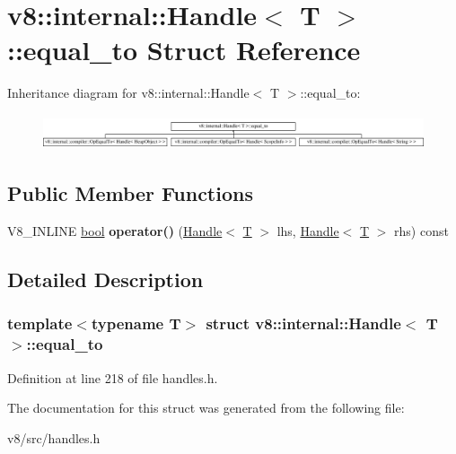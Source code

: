\hypertarget{structv8_1_1internal_1_1Handle_1_1equal__to}{}\section{v8\+:\+:internal\+:\+:Handle$<$ T $>$\+:\+:equal\+\_\+to Struct Reference}
\label{structv8_1_1internal_1_1Handle_1_1equal__to}
Inheritance diagram for v8\+:\+:internal\+:\+:Handle$<$ T $>$\+:\+:equal\+\_\+to\+:\begin{figure}[H]
\begin{center}
\leavevmode
\includegraphics[height=1.039926cm]{structv8_1_1internal_1_1Handle_1_1equal__to}
\end{center}
\end{figure}
\subsection*{Public Member Functions}
\begin{DoxyCompactItemize}
\item 
\mbox{\label{structv8_1_1internal_1_1Handle_1_1equal__to_ab0ee8b53e36e71e6c1a3f898674ddc3c}} 
V8\+\_\+\+I\+N\+L\+I\+NE \mbox{\hyperlink{classbool}{bool}} {\bfseries operator()} (\mbox{\hyperlink{classv8_1_1internal_1_1Handle}{Handle}}$<$ \mbox{\hyperlink{classv8_1_1internal_1_1torque_1_1T}{T}} $>$ lhs, \mbox{\hyperlink{classv8_1_1internal_1_1Handle}{Handle}}$<$ \mbox{\hyperlink{classv8_1_1internal_1_1torque_1_1T}{T}} $>$ rhs) const
\end{DoxyCompactItemize}


\subsection{Detailed Description}
\subsubsection*{template$<$typename T$>$\newline
struct v8\+::internal\+::\+Handle$<$ T $>$\+::equal\+\_\+to}



Definition at line 218 of file handles.\+h.



The documentation for this struct was generated from the following file\+:\begin{DoxyCompactItemize}
\item 
v8/src/handles.\+h\end{DoxyCompactItemize}
